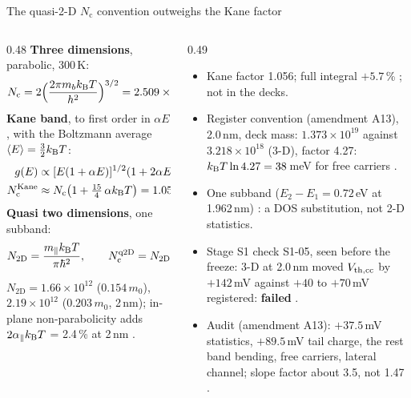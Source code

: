 \begin{frame}{The quasi-2-D $N_{\mathrm{c}}$ convention outweighs the Kane factor}
  \sixteenTop\sixteendense\sixteenEq
  \begin{columns}[T,onlytextwidth]
    \begin{column}{0.48\textwidth}
      \footnotesize
      \textbf{Three dimensions}, parabolic, 300\,K:
      \[ \sixteenNc = 2\Big(\frac{2\pi m_b\kT}{h^2}\Big)^{3/2} = 2.509\times10^{19}\,(m_b/m_0)^{3/2}\ \mathrm{cm^{-3}} \]
      \textbf{Kane band}, to first order in $\alpha E$, with the Boltzmann average $\langle E\rangle = \tfrac32k_{\mathrm{B}}T$:
      \begin{align*}
        g(E) &\propto [E(1+\alpha E)]^{1/2}(1+2\alpha E) \approx E^{1/2}\big(1+\tfrac52\alpha E\big),\\
        N_{\mathrm{c}}^{\mathrm{Kane}} &\approx N_{\mathrm{c}}\big(1+\tfrac{15}{4}\,\alpha k_{\mathrm{B}}T\big) = 1.056\,N_{\mathrm{c}}
          \quad(\alpha = 0.58\,\mathrm{eV^{-1}})
      \end{align*}
      \textbf{Quasi two dimensions}, one subband:
      \[ N_{\mathrm{2D}} = \frac{m_\parallel k_{\mathrm{B}}T}{\pi\hbar^2},\qquad N_{\mathrm{c}}^{\mathrm{q2D}} = N_{\mathrm{2D}}/t \]
      {\scriptsize $N_{\mathrm{2D}} = 1.66\times10^{12}$\cmsq{} ($0.154\,m_0$), $2.19\times10^{12}$\cmsq{} ($0.203\,m_0$, 2\,nm);
        in-plane non-parabolicity adds $2\alpha_\parallel k_{\mathrm{B}}T$ = 2.4\,\% at 2\,nm .\par}
    \end{column}
    \begin{column}{0.49\textwidth}
      \begin{itemize}
        \item Kane factor 1.056; full integral $+5.7$\,\% ; not in the decks.
        \item Register convention (amendment A13), 2.0\,nm, deck mass: $1.373\times10^{19}$ against
          $3.218\times10^{18}$\cmcu{} (3-D), factor 4.27: $k_{\mathrm{B}}T\ln 4.27 = 38$\,meV for free carriers .
        \item One subband ($E_2-E_1 = 0.72$\,eV at 1.962\,nm) : a DOS substitution, not 2-D statistics.
        \item Stage S1 check S1-05, seen before the freeze: 3-D at 2.0\,nm moved $V_{\mathrm{th,cc}}$ by $+142$\,mV against
          $+40$ to $+70$\,mV registered: \textbf{failed} .
        \item Audit (amendment A13): $+37.5$\,mV statistics, $+89.5$\,mV tail charge, the rest band bending, free
          carriers, lateral channel; slope factor about 3.5, not 1.47 .
      \end{itemize}
    \end{column}
  \end{columns}
\end{frame}
